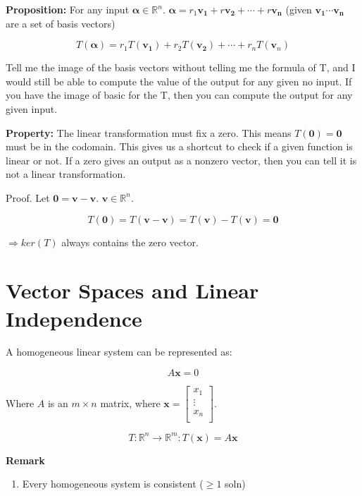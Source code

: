 \documentclass[12pt]{article}
\theoremstyle{plain}
\theoremstyle{remark}
\theoremstyle{definition}
\begin{document}
\textbf{Proposition:} For any input
\(\mathbf{\alpha} \in \mathbb{R}^{n}\text{.\ }\mathbf{\alpha} = r_{1}\mathbf{v_{1}} + r\mathbf{v_{2}} + \cdots + r\mathbf{v_{n}}\)
(given \(\mathbf{v_{1}}\cdots\mathbf{v_{n}}\) are a set of basis
vectors)

\[T\left( \mathbf{\alpha} \right) = r_{1}T\left( \mathbf{v_{1}} \right) + r_{2}T\left( \mathbf{v_{2}} \right) + \cdots + r_{n}T\left( {\mathbf{v}}_{n} \right)\]

Tell me the image of the basis vectors without telling me the formula of
T, and I would still be able to compute the value of the output for any
given no input. If you have the image of basic for the T, then you can
compute the output for any given input.

\textbf{Property:} The linear transformation must fix a zero. This means
\(T\left( \mathbf{0} \right) = \mathbf{0}\) must be in the
codomain. This gives us a shortcut to check if a given function is
linear or not. If a zero gives an output as a nonzero vector, then you
can tell it is not a linear transformation.

Proof. Let
\(\mathbf{0} = \mathbf{v} - \mathbf{v}\text{.\ }\mathbf{v} \in \mathbb{R}^{n}\).

\[T\left( \mathbf{0} \right) = T\left( \mathbf{v} - \mathbf{v} \right) = T\left( \mathbf{v} \right) - T\left( \mathbf{v} \right) = \mathbf{0}\]

\(\Rightarrow ker(T)\) always contains the zero vector.


\section{Vector Spaces and Linear
Independence}

A homogeneous linear system can be represented as:

\[A\mathbf{x} = 0\]

Where \(A\) is an \(m \times n\) matrix, where
\(\mathbf{x} = \begin{bmatrix}
x_{1} \\
 \vdots \\
x_{n} \\
\end{bmatrix}\).

\[T:\mathbb{R}^{n} \rightarrow \mathbb{R}^{m}:T\left( \mathbf{x} \right) = A\mathbf{x}
\]

\textbf{Remark}

\begin{enumerate}
\def\labelenumi{\arabic{enumi}.}
\item
  Every homogeneous system is consistent (\(\geq 1\) soln)
\end{enumerate}
\end{document}
